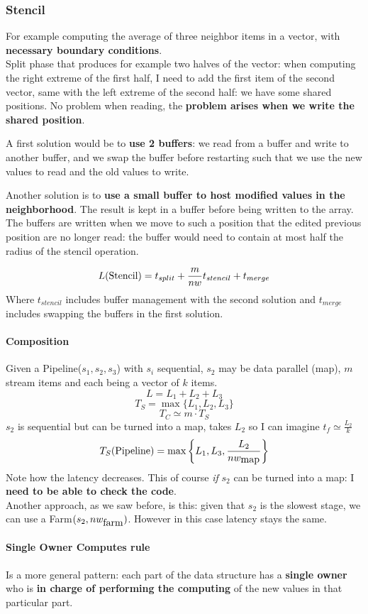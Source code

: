 \documentclass[10pt]{report}
\begin{document}
\subsubsection{Stencil}
For example computing the average of three neighbor items in a vector, with \textbf{necessary boundary conditions}.\\
Split phase that produces for example two halves of the vector: when computing the right extreme of the first half, I need to add the first item of the second vector, same with the left extreme of the second half: we have some shared positions. No problem when reading, the \textbf{problem arises when we write the shared position}.
\begin{list}{}{}
	\item A first solution would be to \textbf{use 2 buffers}: we read from a buffer and write to another buffer, and we swap the buffer before restarting such that we use the new values to read and the old values to write.
	\item Another solution is to \textbf{use a small buffer to host modified values in the neighborhood}. The result is kept in a buffer before being written to the array. The buffers are written when we move to such a position that the edited previous position are no longer read: the buffer would need to contain at most half the radius of the stencil operation.
\end{list}
$$L(\hbox{Stencil}) = t_{split} + \frac{m}{nw}t_{stencil} +t_{merge}$$
Where $t_{stencil}$ includes buffer management with the second solution and $t_{merge}$ includes swapping the buffers in the first solution.
\paragraph{Composition} Given a Pipeline($s_1,s_2,s_3$) with $s_i$ sequential, $s_2$ may be data parallel (map), $m$ stream items and each being a vector of $k$ items.
$$L = L_1+L_2+L_3$$
$$T_S=\max\{L_1,L_2,L_3\}$$
$$T_C\simeq m\cdot T_S$$
$s_2$ is sequential but can be turned into a map, takes $L_2$ so I can imagine $t_f \simeq \frac{L_2}{k}$
$$T_S(\hbox{Pipeline}) = \max\left\{L_1,L_3,\frac{L_2}{nw_{\hbox{map}}}\right\}$$
Note how the latency decreases. This of course \textit{if} $s_2$ can be turned into a map: I \textbf{need to be able to check the code}.\\
Another approach, as we saw before, is this: given that $s_2$ is the slowest stage, we can use a Farm$(s_2, nw_{\hbox{farm}})$. However in this case latency stays the same.
\paragraph{Single Owner Computes rule} Is a more general pattern: each part of the data structure has a \textbf{single owner} who is \textbf{in charge of performing the computing} of the new values in that particular part.
\end{document}

